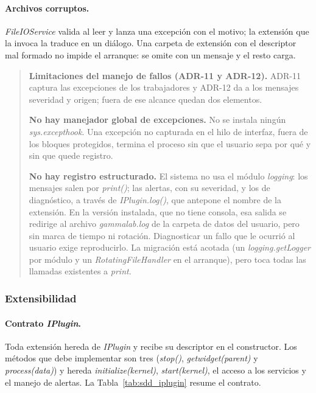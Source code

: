 \documentclass[12pt,letterpaper,oneside]{article}
\DeclareRobustCommand{\_}{\textunderscore\allowbreak}
\begin{document}
\paragraph{Archivos corruptos.} \textit{FileIOService} valida al leer y lanza una excepción con el motivo; la extensión que la invoca la traduce en un diálogo. Una carpeta de extensión con el descriptor mal formado no impide el arranque: se omite con un mensaje y el resto carga.

\begin{quote}
\textbf{Limitaciones del manejo de fallos (ADR-11 y ADR-12).} ADR-11 captura las excepciones de los trabajadores y ADR-12 da a los mensajes severidad y origen; fuera de ese alcance quedan dos elementos.

\textbf{No hay manejador global de excepciones.} No se instala ningún \textit{sys.\allowbreak excepthook}. Una excepción no capturada en el hilo de interfaz, fuera de los bloques protegidos, termina el proceso sin que el usuario sepa por qué y sin que quede registro.

\textbf{No hay registro estructurado.} El sistema no usa el módulo \textit{logging}: los mensajes salen por \textit{print()}; las alertas, con su severidad, y los de diagnóstico, a través de \textit{IPlugin.\_log()}, que antepone el nombre de la extensión. En la versión instalada, que no tiene consola, esa salida se redirige al archivo \textit{gamma\_lab.log} de la carpeta de datos del usuario, pero sin marca de tiempo ni rotación. Diagnosticar un fallo que le ocurrió al usuario exige reproducirlo. La migración está acotada (un \textit{logging.getLogger} por módulo y un \textit{RotatingFileHandler} en el arranque), pero toca todas las llamadas existentes a \textit{print}.
\end{quote}

\subsubsection{Extensibilidad}

\paragraph{Contrato \textit{IPlugin}.} Toda extensión hereda de \textit{IPlugin} y recibe su descriptor en el constructor. Los métodos que debe implementar son tres (\textit{stop()}, \textit{get\_widget(parent)} y \textit{process(data)}) y hereda \textit{initialize(kernel)}, \textit{start(kernel)}, el acceso a los servicios y el manejo de alertas. La Tabla~\ref{tab:sdd_iplugin} resume el contrato.
\end{document}
